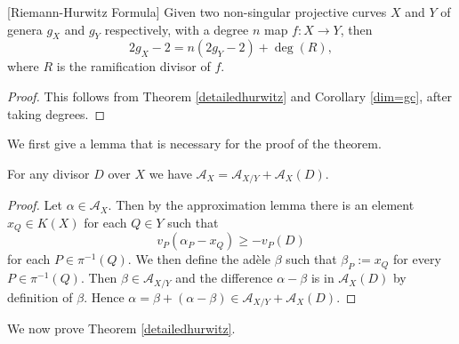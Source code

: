 \begin{cor}\label{hur}[Riemann-Hurwitz Formula]
 Given two non-singular projective curves $X$ and $Y$ of genera $g_X$ and $g_Y$ respectively, with a degree $n$ map $f\colon X \rightarrow Y$, then
 \[
  2g_X - 2 = n(2g_Y -2) + \deg(R),
 \]
where $R$ is the ramification divisor of $f$.
\end{cor}
\begin{proof}
 This follows from Theorem \ref{detailedhurwitz} and Corollary \ref{dim=gc}, after taking degrees.
\end{proof}


We first give a lemma that is necessary for the proof of the theorem.


\begin{lem}\label{adelespacelemma}
 For any divisor $D$ over $X$ we have $\mathcal {A}_X = \mathcal{A}_{X/Y} + \mathcal{A}_X(D)$.
\end{lem}
\begin{proof}
 Let $\alpha \in \mathcal{A}_X$. Then by the approximation lemma there is an element $x_Q\in K(X)$ for each $Q\in Y$ such that 
 \[
  v_P(\alpha_P - x_Q) \geq -v_P(D)
 \]
for each $P\in \pi^{-1}(Q)$. 
We then define the ad\`ele $\beta$ such that $\beta_P := x_Q$ for every $P\in \pi^{-1}(Q)$.
Then $\beta \in \mathcal{A}_{X/Y}$ and the difference $\alpha - \beta$ is in $\mathcal{A}_X(D)$ by definition of $\beta$.
Hence $\alpha = \beta + (\alpha - \beta) \in \mathcal{A}_{X/Y} + \mathcal{A}_X(D)$.
\end{proof}
\begin{comment}
\begin{lem}
 Let $V$ be a vector space over $K(X)$ and let $\mu\colon V\rightarrow K(Y)$ be a $K(Y)$ linear map.
 Then thee is a unique $K(X)$ linear map $\mu'\colon V\rightarrow K(X)$ such that $\Tr_{X/Y}\circ \mu' = \mu$.
\end{lem}
\begin{proof}
 {\bf is prop III.3.3 needed?}
 Let $K(X)^:=\{ \lambda\colon K(X) \rightarrow K(Y)| \lambda L-\text{linear}\}$ be the space of linear forms, which forms a vector space over $K(X)$.
 It is one dimensional over $K(X)$ {\bf (check why)}, and so any $\lambda \in K(X)^*$ can be written as $z\cdot \Tr_{X/Y}$ for some $z\in K(X)$.
 
 If we fix a $v\in V$ then we can define an $L$-linear map $\lambda \colon K(X) \rightarrow K(Y)$ as $\lambda_v(a)\mapsto \mu(av)$.
 So there exists a unique $z_v\in K(X)$ such that $\lambda_v = z_v\cdot \mu$, and we define $\mu'(v) := z_v$.
 Hence
 \[
  \mu(av) = (\mu'(v)\cdot \Tr_{X/Y})(a) = \Tr_{X/Y}(a\cdot \mu'(diffv))
 \]
for every $a\in K(X)$ and $v\in V$.
Since the trace function and $\mu$ are both linear, it follows that $\mu'$ is also.
If we let $a=1$ then the equality $\mu = \Tr_{X/Y} \circ \mu'$, which proves existence.
If there were another such map, say $\mu^*$, then the difference $\mu'-\mu^*\colon V\rightarrow K(X)$ would be surjective, but $\Tr_{X/Y}\circ (\mu'-\mu^*) = 0$.
This implies that $\Tr_{X/Y}=0$, a contradiction, hence $\mu'$is unique.
\end{proof}
\end{comment}
We now prove Theorem \ref{detailedhurwitz}.

